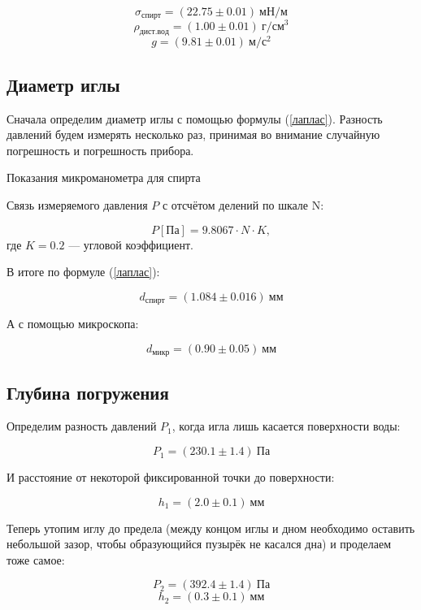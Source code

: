 \documentclass[a4paper,12pt]{article} %
\begin{document}
$$\sigma_{спирт} = (22.75 \pm 0.01) \ мН/м$$
$$\rho_{дист.вод} = (1.00 \pm 0.01) \ г/см^3$$
$$g = (9.81 \pm 0.01) \ м/с^2$$

\subsection*{Диаметр иглы}

Сначала определим диаметр иглы с помощью формулы (\ref{лаплас}). Разность давлений будем измерять несколько раз, принимая во внимание случайную погрешность и погрешность прибора.

\begin{table}[ht!]
	\centering
	
	\caption{Показания микроманометра для спирта}
\end{table}

Связь измеряемого давления $P$ с отсчётом делений по шкале N:

$$P[Па] = 9.8067 \cdot N \cdot K,$$
где $K = 0.2$ — угловой коэффициент.

В итоге по формуле (\ref{лаплас}):

\begin{equation}\label{d_спирт}
	d_{спирт} = (1.084 \pm 0.016) \ мм
\end{equation}

А с помощью микроскопа:

\begin{equation}\label{d_микр}
	d_{микр} = (0.90 \pm 0.05) \ мм
\end{equation}

\subsection*{Глубина погружения}

Определим разность давлений $P_1$, когда игла лишь касается поверхности воды:

\begin{equation}\label{P1}
P_1 = (230.1 \pm 1.4) \ Па
\end{equation}

И расстояние от некоторой фиксированной точки до поверхности:

$$h_1 = (2.0 \pm 0.1) \ мм$$

Теперь утопим иглу до предела (между концом иглы и дном необходимо оставить небольшой зазор, чтобы образующийся пузырёк не касался дна) и проделаем тоже самое:

\begin{equation}\label{P2}
	P_2 = (392.4 \pm 1.4) \ Па
\end{equation}
$$h_2 = (0.3 \pm 0.1) \ мм$$
\end{document}
